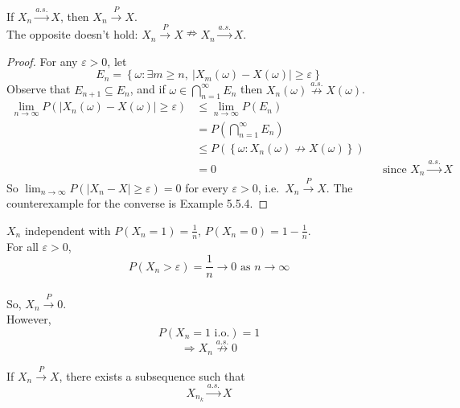 \begin{reqproof}
\begin{proposition}[][5.5.3]
    If $X_n \overset{a.s.}{\longrightarrow} X$, then $X_n \overset{P}{\longrightarrow}X$.
    \\The opposite doesn't hold: $X_n \overset{P}{\longrightarrow} X \nRightarrow X_n \overset{a.s.}{\longrightarrow} X$.
    \begin{proof}
        For any $\varepsilon > 0$, let
        \[E_n = \left\{\omega: \exists m \geq n,\ \left|X_m(\omega) - X(\omega)\right| \geq \varepsilon\right\}\]
        Observe that $E_{n+1} \subseteq E_n$, and if $\omega \in \bigcap_{n=1}^{\infty}E_n$ then $X_n(\omega) \overset{a.s.}{\not\longrightarrow} X(\omega)$.
        \begin{align*}
            \lim_{n\to \infty} P(\left|X_n(\omega) - X(\omega)\right|\geq \varepsilon) &\leq \lim_{n\to \infty} P(E_n)\\
            &= P\left(\bigcap_{n=1}^{\infty}E_n\right)\\
            &\leq P(\left\{\omega : X_n(\omega) \not\to X(\omega)\right\})\\
            &= 0 & &\text{since } X_n \overset{a.s.}{\longrightarrow} X
        \end{align*}
        So $\lim_{n\to\infty} P(|X_n - X| \geq \varepsilon) = 0$ for every $\varepsilon > 0$, i.e.\ $X_n \overset{P}{\longrightarrow} X$. The counterexample for the converse is Example 5.5.4.
    \end{proof}
\end{proposition}
\end{reqproof}

\begin{example}[][5.5.4]
    $X_n$ independent with $P(X_n = 1) = \frac{1}{n}$, $P(X_n = 0) = 1 - \frac{1}{n}$.
    \\For all $\varepsilon > 0$,
    \[P(X_n > \varepsilon) = \frac{1}{n} \to 0 \text{ as }n \to \infty\]
    \\So, $X_n \overset{P}{\longrightarrow} 0$.
    \\However,
    \[P(X_n = 1 \text{ i.o.}) = 1\]
    \[\Rightarrow X_n \overset{a.s.}{\not\longrightarrow} 0\]
\end{example}

\begin{reqnoproof}
\begin{theorem}[][5.5.5]
    If $X_n \overset{P}{\longrightarrow} X$, there exists a subsequence such that
    \[X_{n_k} \overset{a.s.}{\longrightarrow} X\]
\end{theorem}
\end{reqnoproof}

